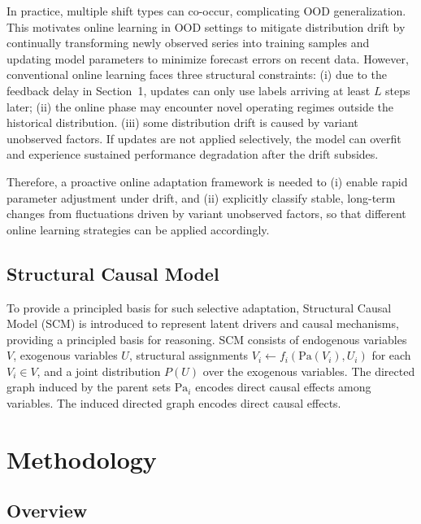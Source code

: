 ﻿\documentclass[journal]{IEEEtran}
\begin{document}
In practice, multiple shift types can co-occur, complicating OOD generalization. This motivates online learning in OOD settings to mitigate distribution drift by continually transforming newly observed series into training samples and updating model parameters to minimize forecast errors on recent data. However, conventional online learning faces three structural constraints: (i) due to the feedback delay in Section~1, updates can only use labels arriving at least $L$ steps later; (ii) the online phase may encounter novel operating regimes outside the historical distribution. (iii) some distribution drift is caused by variant unobserved factors. If updates are not applied selectively, the model can overfit and experience sustained performance degradation after the drift subsides. 

Therefore, a proactive online adaptation framework is needed to (i) enable rapid parameter adjustment under drift, and (ii) explicitly classify stable, long-term changes from fluctuations driven by variant unobserved factors, so that different online learning strategies can be applied accordingly.

\subsection{Structural Causal Model}

To provide a principled basis for such selective adaptation, Structural Causal Model (SCM) is introduced to represent latent drivers and causal mechanisms, providing a principled basis for reasoning. SCM consists of endogenous variables $V$, exogenous variables $U$, structural assignments $V_i \leftarrow f_i(\mathrm{Pa}(V_i), U_i)$ for each $V_i \in V$, and a joint distribution $P(U)$ over the exogenous variables. The directed graph induced by the parent sets $\mathrm{Pa}_i$ encodes direct causal effects among variables. The induced directed graph encodes direct causal effects.

\section{Methodology}
\subsection{Overview}
\end{document}
